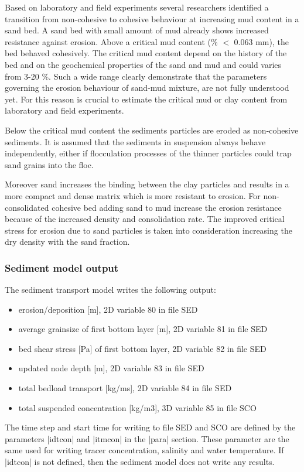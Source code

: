 Based on laboratory and field experiments several researchers identified a
transition from non-cohesive to cohesive behaviour at increasing mud content
in a sand bed. A sand bed with small amount of mud already shows increased
resistance against erosion. Above a critical mud content (\% $<$ 0.063 mm), 
the bed behaved cohesively. The critical mud content depend on the history 
of the bed and on the geochemical properties of the sand and mud and could 
varies from 3-20 \%. Such a wide range clearly demonstrate that the 
parameters governing the erosion behaviour of sand-mud mixture, are
 not fully understood yet. For this reason is crucial to estimate 
the critical mud or clay content from laboratory and field experiments.

Below the critical mud content the sediments particles are eroded as
non-cohesive sediments. It is assumed that the sediments in suspension
always behave independently, either if flocculation processes of the
thinner particles could trap sand grains into the floc.

Moreover sand increases the binding between the clay particles and results
in a more compact and dense matrix which is more resistant to erosion. For
non-consolidated cohesive bed adding sand to mud increase the erosion
resistance because of the increased density and consolidation rate.
The improved critical stress for erosion due to sand particles is taken
into consideration increasing the dry density with the sand fraction.

\subsubsection{Sediment model output}
The sediment transport model writes the following output:
\begin{itemize}
\item erosion/deposition [m], 2D variable 80 in file SED
\item average grainsize of first bottom layer [m], 2D variable 81 in file SED 
\item bed shear stress [Pa] of first bottom layer, 2D variable 82 in file SED
\item updated node depth [m], 2D variable 83 in file SED
\item total bedload transport [kg/ms], 2D variable 84 in file SED
\item total suspended concentration [kg/m3], 3D variable 85 in file SCO
\end{itemize}

The time step and start time for writing to file SED and SCO
are defined by the parameters |idtcon| and |itmcon| in the |para|
section. These parameter are the same used for writing tracer
concentration, salinity and water temperature. If |idtcon| is not
defined, then the sediment model does not write any results.


